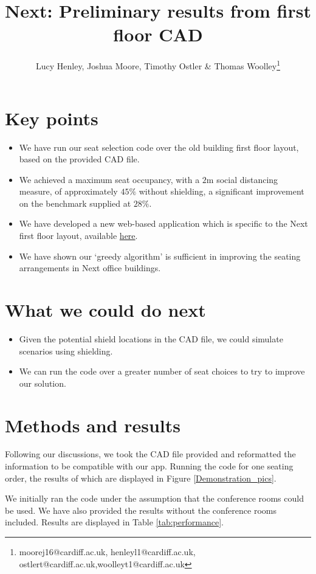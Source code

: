 \documentclass[11pt,a4paper]{article}
\title{Next: Preliminary results from first floor CAD}
\author{Lucy Henley, Joshua Moore, Timothy Ostler \& Thomas Woolley\footnote{moorej16@cardiff.ac.uk, henleyl1@cardiff.ac.uk, ostlert@cardiff.ac.uk,woolleyt1@cardiff.ac.uk}}
\begin{document}
\maketitle

\section*{Key points}
\begin{itemize}
\item We have run our seat selection code over the old building first floor layout, based on the provided CAD file.
\item We achieved a maximum seat occupancy, with a $2$m social distancing measure, of approximately $45\%$ without shielding, a significant improvement on the benchmark supplied at $28\%$.
\item We have developed a new web-based application which is specific to the Next first floor layout, available \href{https://lucyhenley.shinyapps.io/Next_seating/?fbclid=IwAR2Rx-OmoSkYHlw6BnQSKLgJGQt7VJvaX2IJYbqgKu4MK9YZxoZn1gBBAaEp}{here}. %
\item We have shown our `greedy algorithm' is sufficient in improving the seating arrangements in Next office buildings.
\end{itemize}

\section*{What we could do next}
\begin{itemize}
\item Given the potential shield locations in the CAD file, we could simulate scenarios using shielding.
\item We can run the code over a greater number of seat choices to try to improve  our solution.
\end{itemize}



\section*{Methods and results}
Following our discussions, we took the CAD file provided and reformatted the information to be compatible with our app. Running the code for one seating order, the results of which are displayed in Figure \ref{Demonstration_pics}.


We initially ran the code under the assumption that the conference rooms could be used. We have also provided the results without the conference rooms included. Results are displayed in Table \ref{tab:performance}.
\end{document}
